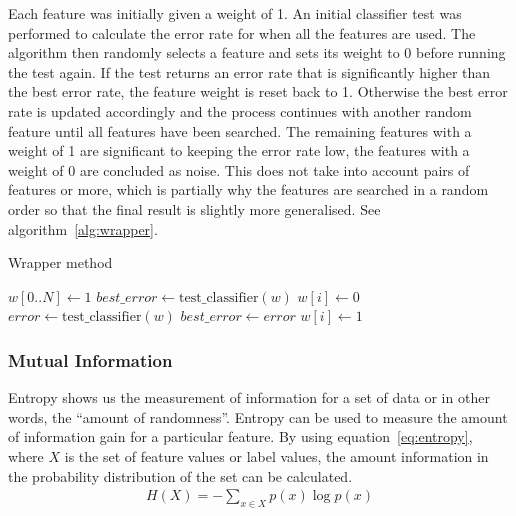 Each feature was initially given a weight of 1. An initial classifier test was performed to calculate the error rate for when
all the features are used. The algorithm then randomly selects a feature and sets its weight to 0 before running the test again.
If the test returns an error rate that is significantly higher than the best error rate, the feature weight is reset back to 1.
Otherwise the best error rate is updated accordingly and the process continues with another random feature until all features
have been searched. The remaining features with a weight of 1 are significant to keeping the error rate low, the features with a
weight of 0 are concluded as noise. This does not take into account pairs of features or more, which is partially why the
features are searched in a random order so that the final result is slightly more generalised. See algorithm~\ref{alg:wrapper}.

\begin{algorithm}
    \label{alg:wrapper}
    \caption{Wrapper method}
    \begin{algorithmic}
        \STATE $w[0..N] \gets 1$
        \STATE $best\_ error \gets \mathrm{test\_ classifier}(w)$
            \STATE $w[i] \gets 0$
            \STATE $error \gets \mathrm{test\_ classifier}(w)$
                \STATE $best\_error \gets error$
                \STATE $w[i] \gets 1$
            \ENDIF
        \ENDFOR
    \end{algorithmic}
\end{algorithm}


\subsubsection{Mutual Information}
\label{sec:mutual_informaton}
Entropy shows us the measurement of information for a set of data or in other words, the ``amount of randomness''. Entropy can
be used to measure the amount of information gain for a particular feature. By using equation~\ref{eq:entropy}, where $X$ is
the set of feature values or label values, the amount information in the probability distribution of the set can be calculated.
\begin{align}
	\label{eq:entropy}
	H(X) = -\sum_{x \in X} p(x) \log p(x)
\end{align}

